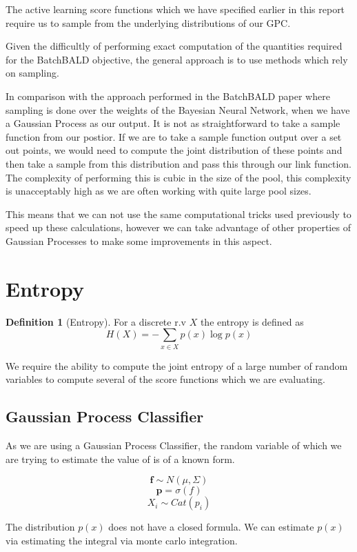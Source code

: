 \documentclass[12pt, a4paper]{report}
\theoremstyle{definition}
\theoremstyle{definition}
\newtheorem{definition}{Definition}[section]
\theoremstyle{definition}
\begin{document}
The active learning score functions which we have specified earlier in this report require us to sample from the underlying distributions of our GPC.

Given the difficultly of performing exact computation of the quantities required for the BatchBALD objective, the general approach is to use methods which rely on sampling.

In comparison with the approach performed in the BatchBALD paper where sampling is done over the weights of the Bayesian Neural Network, when we have a Gaussian Process as our output. It is not as straightforward to take a sample function from our postior. If we are to take a sample function output over a set out points, we would need to compute the joint distribution of these points and then take a sample from this distribution and pass this through our link function.
The complexity of performing this is cubic in the size of the pool, this complexity is unacceptably high as we are often working with quite large pool sizes.

This means that we can not use the same computational tricks used previously to speed up these calculations, however we can take advantage of other properties of Gaussian Processes to make some improvements in this aspect.


\section{Entropy}
\label{sec:Entropy}

\begin{definition}[Entropy]
    For a discrete r.v $X$ the entropy is defined as $$H(X) = - \sum_{x \in X} p(x) \log p(x) $$
\end{definition}


We require the ability to compute the joint entropy of a large number of random variables to compute several of the score functions which we are evaluating.

\subsection{Gaussian Process Classifier}
As we are using a Gaussian Process Classifier, the random variable of which we are trying to estimate the value of is of a known form.


$$ \mathbf{f} \sim N(\mu, \Sigma) $$
$$ \mathbf{p} =  \sigma \left(f \right) $$
$$ X_i \sim Cat(p_i) $$

The distribution $p(x)$ does not have a closed formula. We can estimate $p(x)$ via estimating the integral via monte carlo integration.
\end{document}
